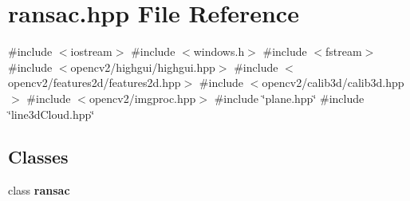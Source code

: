 \section{ransac.\+hpp File Reference}
\label{ransac_8hpp}
{\ttfamily \#include $<$iostream$>$}\newline
{\ttfamily \#include $<$windows.\+h$>$}\newline
{\ttfamily \#include $<$fstream$>$}\newline
{\ttfamily \#include $<$opencv2/highgui/highgui.\+hpp$>$}\newline
{\ttfamily \#include $<$opencv2/features2d/features2d.\+hpp$>$}\newline
{\ttfamily \#include $<$opencv2/calib3d/calib3d.\+hpp$>$}\newline
{\ttfamily \#include $<$opencv2/imgproc.\+hpp$>$}\newline
{\ttfamily \#include \char`\"{}plane.\+hpp\char`\"{}}\newline
{\ttfamily \#include \char`\"{}line3d\+Cloud.\+hpp\char`\"{}}\newline
\subsection*{Classes}
\begin{DoxyCompactItemize}
\item 
class \textbf{ ransac}
\end{DoxyCompactItemize}
